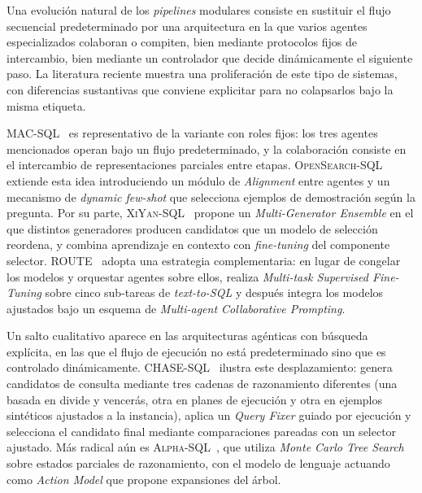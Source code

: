 Una evolución natural de los \emph{pipelines} modulares consiste en sustituir
el flujo secuencial predeterminado por una arquitectura en la que varios
agentes especializados colaboran o compiten, bien mediante protocolos fijos
de intercambio, bien mediante un controlador que decide dinámicamente el
siguiente paso. La literatura reciente muestra una proliferación de este
tipo de sistemas, con diferencias sustantivas que conviene explicitar para no
colapsarlos bajo la misma etiqueta.

\textsc{MAC-SQL}~\cite{MAC-SQL2023} es representativo de la variante con
roles fijos: los tres agentes mencionados operan bajo un flujo
predeterminado, y la colaboración consiste en el intercambio de
representaciones parciales entre etapas. \textsc{OpenSearch-SQL}~%
\cite{OpenSearch-SQL2025} extiende esta idea introduciendo un módulo de
\emph{Alignment} entre agentes y un mecanismo de \emph{dynamic few-shot}
que selecciona ejemplos de demostración según la pregunta. Por su parte,
\textsc{XiYan-SQL}~\cite{XiYan-SQL2024} propone un \emph{Multi-Generator
Ensemble} en el que distintos generadores producen candidatos que un modelo
de selección reordena, y combina aprendizaje en contexto con
\emph{fine-tuning} del componente selector. \textsc{ROUTE}~%
\cite{ROUTE2025} adopta una estrategia complementaria: en lugar de congelar
los modelos y orquestar agentes sobre ellos, realiza \emph{Multi-task
Supervised Fine-Tuning} sobre cinco sub-tareas de \emph{text-to-SQL} y
después integra los modelos ajustados bajo un esquema de \emph{Multi-agent
Collaborative Prompting}.

Un salto cualitativo aparece en las arquitecturas agénticas con búsqueda
explícita, en las que el flujo de ejecución no está predeterminado sino que
es controlado dinámicamente. \textsc{CHASE-SQL}~\cite{CHASE-SQL2025} ilustra
este desplazamiento: genera candidatos de consulta mediante tres cadenas de
razonamiento diferentes (una basada en divide y vencerás, otra en planes de
ejecución y otra en ejemplos sintéticos ajustados a la instancia), aplica un
\emph{Query Fixer} guiado por ejecución y selecciona el candidato final
mediante comparaciones pareadas con un selector ajustado. Más radical aún es
\textsc{Alpha-SQL}~\cite{Alpha-SQL2025}, que utiliza \emph{Monte Carlo Tree
Search} sobre estados parciales de razonamiento, con el modelo de lenguaje
actuando como \emph{Action Model} que propone expansiones del árbol.

